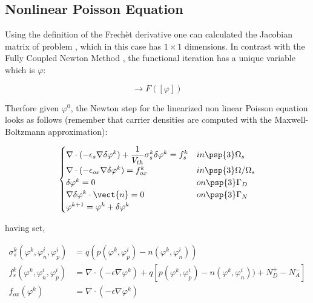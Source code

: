 \subsection{Nonlinear Poisson Equation}

Using the definition of the Frech\`et derivative one can calculated the Jacobian matrix of problem , which in this case has $1\times 1$ dimensions. In contrast with the Fully Coupled Newton Method , the functional iteration has a unique variable which is $\varphi$:

\begin{equation}
[\varphi] \rightarrow F([\varphi])
\end{equation}

Therfore given $\varphi^0$, the Newton step for the linearized non linear Poisson equation looks as follows (remember that carrier densities are computed with the Maxwell-Boltzmann approximation):

\begin{equation}
\label{eq: newton step NLP}
\begin{cases}

\nabla \cdot (-\epsilon_s \nabla \delta\varphi^k) 
+   \dfrac{1}{V_{th}} \sigma_s^k\delta\varphi^k 
 =  f_s^k & in \psp{3} \Omega_s
  \\
\nabla \cdot (-\epsilon_{ox} \nabla \delta\varphi^k) =  f_{ox}^k & in \psp{3} \Omega / \Omega_s 
\\
\delta \varphi^k = 0 & on \psp{3} \Gamma_D 
\\
\nabla \delta \varphi^k \cdot \vect{n} = 0 & on \psp{3} \Gamma_N
\\
\varphi^{k+1}=\varphi^k+\delta \varphi^k
\end{cases} 
\end{equation}

having set,

\begin{align*}
\sigma_s^k(\varphi^{k},\varphi_n^{i},\varphi_p^{i}) & =q(p(\varphi^k,\varphi_p^i)-n(\varphi^k,\varphi_n^i))
\\
f_s^k(\varphi^k,\varphi_n^i,\varphi_p^i) & = \nabla \cdot (-\epsilon \nabla \varphi^k) + q\left[ p(\varphi^k,\varphi_p^i)-n(\varphi^k,\varphi_n^i)) + N_D^+-N_A^- \right]
\\
f_{ox}(\varphi^k) & = \nabla \cdot (-\epsilon \nabla \varphi^k) 
\end{align*}

